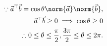 \begin{align}
\because  {\vec{a}^{\top}\vec{b}}=\cos\theta\norm{\vec{a}}\norm{\vec{b}},\\
 {\vec{a}^{\top}\vec{b}}\ge0 \implies 
 \cos\theta\ge0\\
	\therefore 0\le\theta\le\frac{\pi}{2}, \frac{3\pi}{2}\le\theta\le{2\pi}.
\label{eq:chapters/12/10/5/161}
\end{align}

